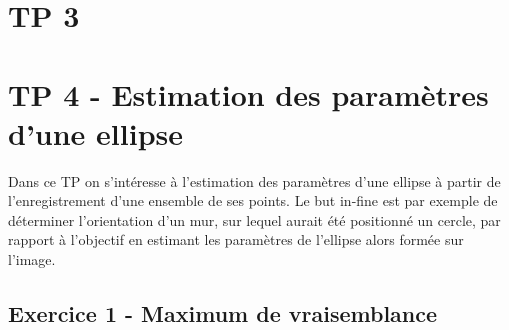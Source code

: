 \documentclass{article}
\begin{document}
\clearpage
\section{TP 3}
\clearpage
\section{TP 4 - Estimation des paramètres d'une ellipse}
Dans ce TP on s'intéresse à l'estimation des paramètres d'une ellipse à partir de l'enregistrement d'une ensemble de ses points. Le but in-fine est par exemple de déterminer l'orientation d'un mur, sur lequel aurait été positionné un cercle, par rapport à l'objectif en estimant les paramètres de l'ellipse alors formée sur l'image.

\subsection{Exercice 1 - Maximum de vraisemblance}
\end{document}

